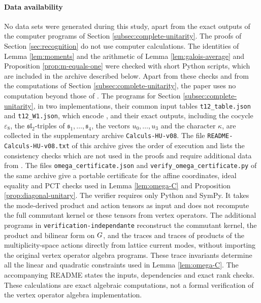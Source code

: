 \documentclass[leqno]{article}
\let\cal\relax
\newcommand{\cal}{\mathcal}
\newcommand{\epsi}{\varepsilon}
\numberwithin{equation}{section}
\begin{document}
\paragraph{Data availability} No data sets were generated during this study, apart from the exact outputs of the computer programs of Section \ref{subsec:complete-unitarity}. The proofs of Section \ref{sec:recognition} do not use computer calculations. The identities of Lemma \ref{lem:moments} and the arithmetic of Lemma \ref{lem:galois-average} and Proposition \ref{prop:m-equals-one} were checked with short Python scripts, which are included in the archive described below. Apart from these checks and from the computations of Section \ref{subsec:complete-unitarity}, the paper uses no computation beyond those of \cite{Arh26}. The programs for Section \ref{subsec:complete-unitarity}, in two implementations, their common input tables \texttt{t12\_table.json} and \texttt{t12\_W1.json}, which encode \cite[Table 2]{Arh26}, and their exact outputs, including the cocycle $\epsi_8$, the $\mathfrak{sl}_2$-triples of $\mathfrak s_1, \ldots, \mathfrak s_4$, the vectors $u_0, \ldots, u_3$ and the character $\kappa$, are collected in the supplementary archive \texttt{Calculs-HU-v08}. The file \texttt{README-Calculs-HU-v08.txt} of this archive gives the order of execution and lists the consistency checks which are not used in the proofs and require additional data from \cite{Arh26}. The files \texttt{omega\_certificate.json} and \texttt{verify\_omega\_certificate.py} of the same archive give a portable certificate for the affine coordinates, ideal equality and PCT checks used in Lemma \ref{lem:omega-C} and Proposition \ref{prop:diagonal-unitary}. The verifier requires only Python and SymPy. It takes the mode-derived product and action tensors as input and does not recompute the full commutant kernel or these tensors from vertex operators. The additional programs in \texttt{verification-independante} reconstruct the commutant kernel, the product and bilinear form on $\cal G$, and the traces and traces of products of the multiplicity-space actions directly from lattice current modes, without importing the original vertex operator algebra programs. These trace invariants determine all the linear and quadratic constraints used in Lemma \ref{lem:omega-C}. The accompanying README states the inputs, dependencies and exact rank checks. These calculations are exact algebraic computations, not a formal verification of the vertex operator algebra implementation.
\end{document}
